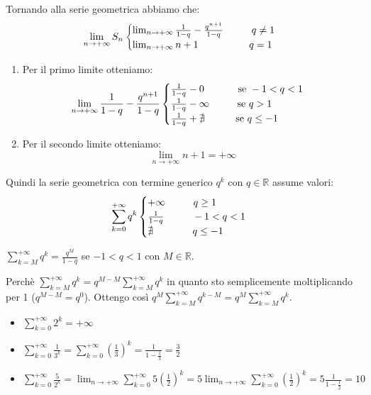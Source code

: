 Tornando alla serie geometrica abbiamo che:
$$\lim_{n\to+\infty}S_n\begin{cases}
    \lim_{n\to+\infty}\frac{1}{1-q}-\frac{q^{n+1}}{1-q}\hspace{1cm}q\neq1\\
    \lim_{n\to+\infty}n+1\hspace{1.8cm}q=1
\end{cases}$$

\begin{enumerate}
    \item Per il primo limite otteniamo:
    $$\lim_{n\to+\infty}\frac{1}{1-q}-\frac{q^{n+1}}{1-q}\begin{cases}
        \frac{1}{1-q}-0\hspace{1.2cm}\text{se }-1<q<1\\
        \frac{1}{1-q}-\infty\hspace{1cm}\text{se }q>1\\
        \frac{1}{1-q}+\nexists\hspace{1.1cm}\text{se }q\leq-1
    \end{cases}$$
    
    \item Per il secondo limite otteniamo:
    \begin{equation*}
        \lim_{n\to+\infty}n+1=+\infty
    \end{equation*}
\end{enumerate}

Quindi la serie geometrica con termine generico $q^k$ con $q\in\mathbb{R}$ assume valori:
$$\sum^{+\infty}_{k=0}q^k\begin{cases}
    +\infty\hspace{1cm}q\geq1\\
    \frac{1}{1-q}\hspace{1cm}-1<q<1\\
    \nexists\hspace{1.4cm}q\leq-1
\end{cases}$$

\begin{osservation*}
    $\sum^{+\infty}_{k=M}q^k=\frac{q^M}{1-q}$ se $-1<q<1$ con $M\in\mathbb{R}$.
    
    Perchè $\sum^{+\infty}_{k=M}q^k=q^{M-M}\sum^{+\infty}_{k=M}q^k$ in quanto sto semplicemente moltiplicando per 1 ($q^{M-M}=q^0$). Ottengo così $q^M\sum^{+\infty}_{k=M}q^{k-M}=q^M\sum^{+\infty}_{k=M}q^k$.
\end{osservation*}

\begin{example}
    \begin{itemize}
        \item $\sum^{+\infty}_{k=0}2^k=+\infty$
        \item $\sum^{+\infty}_{k=0}\frac{1}{3^k}=\sum^{+\infty}_{k=0}(\frac{1}{3})^k=\frac{1}{1-\frac{1}{3}}=\frac{3}{2}$
        \item $\sum^{+\infty}_{k=0}\frac{5}{2^k}=\lim_{n\to+\infty}\sum^{+\infty}_{k=0}5(\frac{1}{2})^k=5\lim_{n\to+\infty}\sum^{+\infty}_{k=0}(\frac{1}{2})^k=5\frac{1}{1-\frac{1}{2}}=10$
    \end{itemize}
\end{example}

